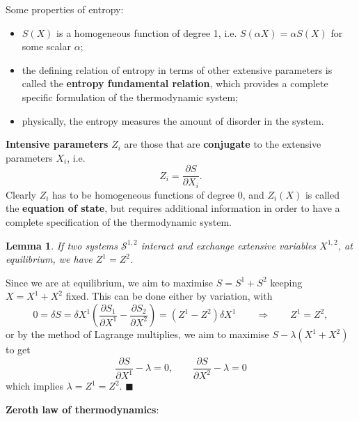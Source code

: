 \documentclass[letter-paper]{tufte-book}
\newtheorem{lemma}[theorem]{\color{pastel-blue}Lemma}
\newenvironment{proof}[1][Proof]{\begin{trivlist}
\item[\hskip \labelsep {\bfseries #1}]}{\end{trivlist}}
\newcommand\Def[1]{\textbf{#1}}
\newcommand{\qed}{\hfill$\blacksquare$}
\begin{document}
Some properties of entropy:
\begin{itemize}
  \item $S(X)$ is a homogeneous function of degree 1, i.e. $S(\alpha X) =
  \alpha S(X)$ for some scalar $\alpha$;
  \item the defining relation of entropy in terms of other extensive parameters
  is called the \Def{entropy fundamental relation}, which provides a complete
  specific formulation of the thermodynamic system;
  \item physically, the entropy measures the amount of disorder in the system.
\end{itemize}

\Def{Intensive parameters} $Z_i$ are those that are \Def{conjugate} to the
extensive parameters $X_i$, i.e.
\begin{equation}
  Z_i = \frac{\partial S}{\partial X_i}.
\end{equation}
Clearly $Z_i$ has to be homogeneous functions of degree 0, and $Z_i(X)$ is
called the \Def{equation of state}, but requires additional information in order
to have a complete specification of the thermodynamic system.

\begin{lemma}
If two systems $\mathcal{S}^{1,2}$ interact and exchange extensive variables
$X^{1,2}$, at equilibrium, we have $Z^1 = Z^2$.
\end{lemma}
\begin{proof}
Since we are at equilibrium, we aim to maximise $S = S^1 + S^2$ keeping $X = X^1
+ X^2$ fixed. This can be done either by variation, with
\begin{equation*}
  0 = \delta S = \delta X^1 \left(\frac{\partial S_1}{\partial X^1} - \frac{\partial S_2}{\partial X^2}\right) = (Z^1 - Z^2) \delta X^1 \qquad \Rightarrow \qquad Z^1 = Z^2,
\end{equation*}
or by the method of Lagrange multiplies, we aim to maximise $S - \lambda(X^1 +
X^2)$ to get
\begin{equation*}
  \frac{\partial S}{\partial X^1} - \lambda = 0, \qquad \frac{\partial S}{\partial X^2} - \lambda = 0
\end{equation*}
which implies $\lambda = Z^1 = Z^2$.
\qed
\end{proof}

\vspace*{3mm}

\Def{Zeroth law of thermodynamics}:
\end{document}
